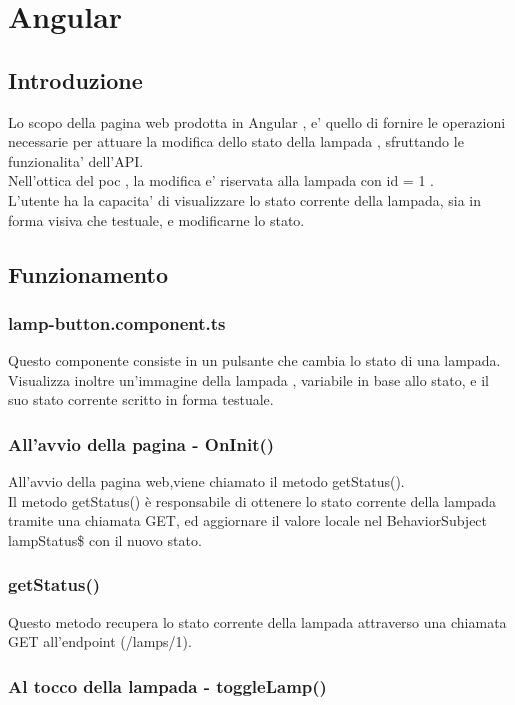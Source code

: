 \chapter{Angular}\label{angular}

\section{Introduzione}

Lo scopo della pagina web prodotta in Angular , e' quello di fornire le operazioni necessarie per attuare la modifica dello stato della lampada , sfruttando le funzionalita' dell'API. \\
Nell'ottica del poc , la modifica e' riservata alla lampada con id = 1 . \\
L'utente ha la capacita' di visualizzare lo stato corrente della lampada, sia in forma visiva che testuale, e modificarne lo stato. 

\section{Funzionamento}

\subsection{lamp-button.component.ts}
Questo componente consiste in un pulsante che cambia lo stato di una lampada. Visualizza inoltre un'immagine della lampada , variabile in base allo stato, e il suo stato corrente scritto in forma testuale.

\subsection{All'avvio della pagina - OnInit()}
All'avvio della pagina web,viene chiamato il metodo getStatus().\\
Il metodo getStatus() è responsabile di ottenere lo stato corrente della lampada tramite una chiamata GET, ed aggiornare il valore locale nel BehaviorSubject lampStatus\$ con il nuovo stato.

\subsection{getStatus()}
Questo metodo recupera lo stato corrente della lampada attraverso una chiamata GET all'endpoint (/lamps/1). \\

\subsection{Al tocco della lampada - toggleLamp()}

